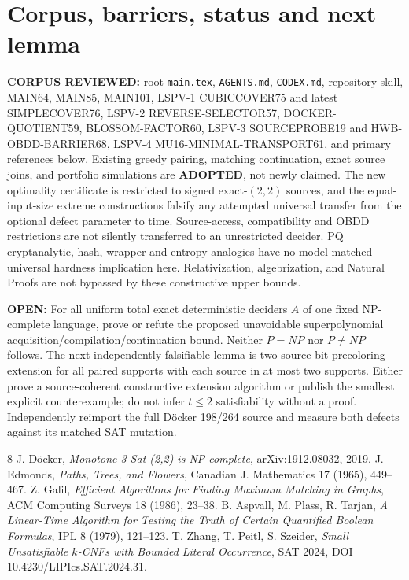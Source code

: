 \documentclass[11pt]{article}
\begin{document}
\section{Corpus, barriers, status and next lemma}
\noindent\textbf{CORPUS REVIEWED:} root \texttt{main.tex}, \texttt{AGENTS.md}, \texttt{CODEX.md}, repository skill, MAIN64, MAIN85, MAIN101, LSPV-1 CUBICCOVER75 and latest SIMPLECOVER76, LSPV-2 REVERSE-SELECTOR57, DOCKER-QUOTIENT59, BLOSSOM-FACTOR60, LSPV-3 SOURCEPROBE19 and HWB-OBDD-BARRIER68, LSPV-4 MU16-MINIMAL-TRANSPORT61, and primary references below. Existing greedy pairing, matching continuation, exact source joins, and portfolio simulations are \textbf{ADOPTED}, not newly claimed. The new optimality certificate is restricted to signed exact-$(2,2)$ sources, and the equal-input-size extreme constructions falsify any attempted universal transfer from the optional defect parameter to time. Source-access, compatibility and OBDD restrictions are not silently transferred to an unrestricted decider. PQ cryptanalytic, hash, wrapper and entropy analogies have no model-matched universal hardness implication here. Relativization, algebrization, and Natural Proofs are not bypassed by these constructive upper bounds.

\noindent\textbf{OPEN:} For all uniform total exact deterministic deciders $A$ of one fixed NP-complete language, prove or refute the proposed unavoidable superpolynomial acquisition/compilation/continuation bound. Neither $P=NP$ nor $P\ne NP$ follows. The next independently falsifiable lemma is two-source-bit precoloring extension for all paired supports with each source in at most two supports. Either prove a source-coherent constructive extension algorithm or publish the smallest explicit counterexample; do not infer $t\le2$ satisfiability without a proof. Independently reimport the full D\"ocker 198/264 source and measure both defects against its matched SAT mutation.

\begin{thebibliography}{8}
 J. D\"ocker, \emph{Monotone 3-Sat-(2,2) is NP-complete}, arXiv:1912.08032, 2019.
 J. Edmonds, \emph{Paths, Trees, and Flowers}, Canadian J. Mathematics 17 (1965), 449--467.
 Z. Galil, \emph{Efficient Algorithms for Finding Maximum Matching in Graphs}, ACM Computing Surveys 18 (1986), 23--38.
 B. Aspvall, M. Plass, R. Tarjan, \emph{A Linear-Time Algorithm for Testing the Truth of Certain Quantified Boolean Formulas}, IPL 8 (1979), 121--123.
 T. Zhang, T. Peitl, S. Szeider, \emph{Small Unsatisfiable $k$-CNFs with Bounded Literal Occurrence}, SAT 2024, DOI 10.4230/LIPIcs.SAT.2024.31.
\end{thebibliography}
\end{document}
